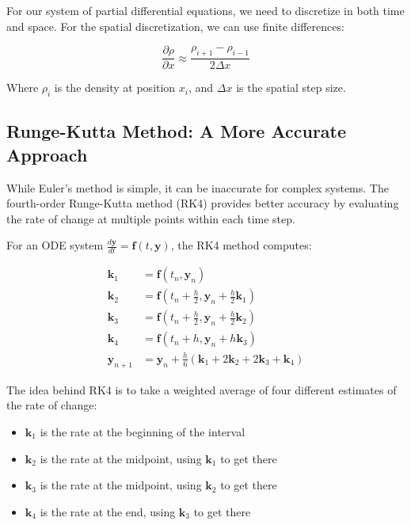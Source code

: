 \documentclass[a4paper,12pt]{article}
\begin{document}
For our system of partial differential equations, we need to discretize in both time and space. For the spatial discretization, we can use finite differences:

\begin{equation}
\frac{\partial \rho}{\partial x} \approx \frac{\rho_{i+1} - \rho_{i-1}}{2\Delta x}
\end{equation}

Where $\rho_i$ is the density at position $x_i$, and $\Delta x$ is the spatial step size.

\subsection{Runge-Kutta Method: A More Accurate Approach}

While Euler's method is simple, it can be inaccurate for complex systems. The fourth-order Runge-Kutta method (RK4) provides better accuracy by evaluating the rate of change at multiple points within each time step.

For an ODE system $\frac{d\mathbf{y}}{dt} = \mathbf{f}(t, \mathbf{y})$, the RK4 method computes:

\begin{align}
\mathbf{k}_1 &= \mathbf{f}(t_n, \mathbf{y}_n) \\
\mathbf{k}_2 &= \mathbf{f}(t_n + \frac{h}{2}, \mathbf{y}_n + \frac{h}{2}\mathbf{k}_1) \\
\mathbf{k}_3 &= \mathbf{f}(t_n + \frac{h}{2}, \mathbf{y}_n + \frac{h}{2}\mathbf{k}_2) \\
\mathbf{k}_4 &= \mathbf{f}(t_n + h, \mathbf{y}_n + h\mathbf{k}_3) \\
\mathbf{y}_{n+1} &= \mathbf{y}_n + \frac{h}{6}(\mathbf{k}_1 + 2\mathbf{k}_2 + 2\mathbf{k}_3 + \mathbf{k}_4)
\end{align}

The idea behind RK4 is to take a weighted average of four different estimates of the rate of change:
\begin{itemize}
    \item $\mathbf{k}_1$ is the rate at the beginning of the interval
    \item $\mathbf{k}_2$ is the rate at the midpoint, using $\mathbf{k}_1$ to get there
    \item $\mathbf{k}_3$ is the rate at the midpoint, using $\mathbf{k}_2$ to get there
    \item $\mathbf{k}_4$ is the rate at the end, using $\mathbf{k}_3$ to get there
\end{itemize}
\end{document}
